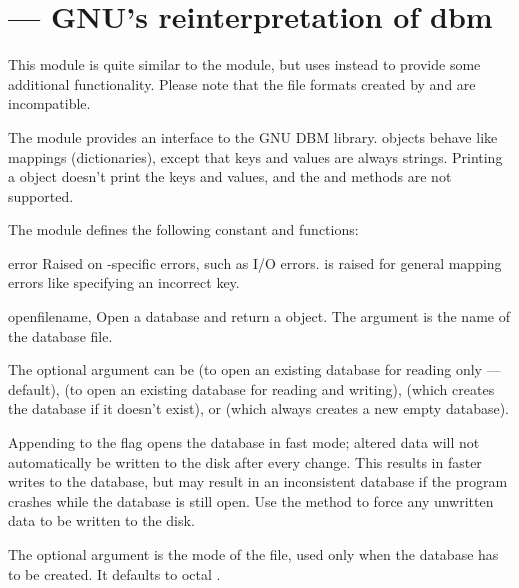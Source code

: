 \section{ ---
         GNU's reinterpretation of dbm}



This module is quite similar to the 
module, but uses  instead to provide some additional
functionality.  Please note that the file formats created by
 and  are incompatible.

The  module provides an interface to the GNU DBM
library.   objects behave like mappings
(dictionaries), except that keys and values are always strings.
Printing a  object doesn't print the keys and values, and
the  and  methods are not supported.

The module defines the following constant and functions:

\begin{excdesc}{error}
Raised on -specific errors, such as I/O errors.
 is raised for general mapping errors like
specifying an incorrect key.
\end{excdesc}

\begin{funcdesc}{open}{filename, }
Open a  database and return a  object.  The
 argument is the name of the database file.

The optional  argument can be
 (to open an existing database for reading only --- default),
 (to open an existing database for reading and writing),
 (which creates the database if it doesn't exist), or
 (which always creates a new empty database).

Appending  to the flag opens the database in fast mode;
altered data will not automatically be written to the disk after every
change.  This results in faster writes to the database, but may result
in an inconsistent database if the program crashes while the database
is still open.  Use the  method to force any unwritten
data to be written to the disk.

The optional  argument is the \UNIX{} mode of the file, used
only when the database has to be created.  It defaults to octal
.
\end{funcdesc}

